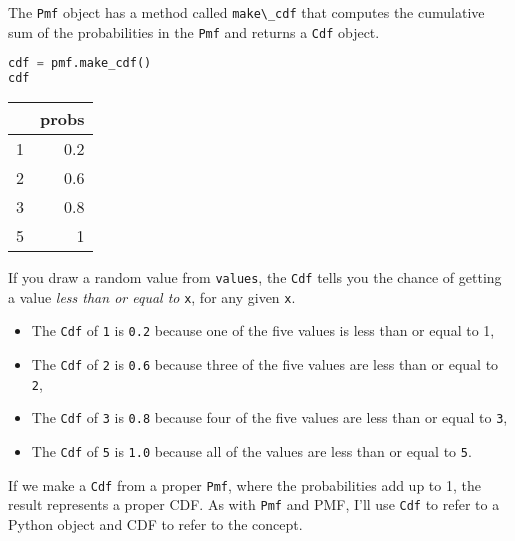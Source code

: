 The \passthrough{\lstinline!Pmf!} object has a method called
\passthrough{\lstinline!make\_cdf!} that computes the cumulative sum of
the probabilities in the \passthrough{\lstinline!Pmf!} and returns a
\passthrough{\lstinline!Cdf!} object.

\begin{lstlisting}[language=Python,style=source]
cdf = pmf.make_cdf()
cdf
\end{lstlisting}

\begin{tabular}{lr}
\midrule
 & probs \\
\midrule
1 & 0.2 \\
2 & 0.6 \\
3 & 0.8 \\
5 & 1 \\
\midrule
\end{tabular}

If you draw a random value from \passthrough{\lstinline!values!}, the
\passthrough{\lstinline!Cdf!} tells you the chance of getting a value
\emph{less than or equal to} \passthrough{\lstinline!x!}, for any given
\passthrough{\lstinline!x!}.

\begin{itemize}
\item
  The \passthrough{\lstinline!Cdf!} of \passthrough{\lstinline!1!} is
  \passthrough{\lstinline!0.2!} because one of the five values is less
  than or equal to 1,
\item
  The \passthrough{\lstinline!Cdf!} of \passthrough{\lstinline!2!} is
  \passthrough{\lstinline!0.6!} because three of the five values are
  less than or equal to \passthrough{\lstinline!2!},
\item
  The \passthrough{\lstinline!Cdf!} of \passthrough{\lstinline!3!} is
  \passthrough{\lstinline!0.8!} because four of the five values are less
  than or equal to \passthrough{\lstinline!3!},
\item
  The \passthrough{\lstinline!Cdf!} of \passthrough{\lstinline!5!} is
  \passthrough{\lstinline!1.0!} because all of the values are less than
  or equal to \passthrough{\lstinline!5!}.
\end{itemize}

If we make a \passthrough{\lstinline!Cdf!} from a proper
\passthrough{\lstinline!Pmf!}, where the probabilities add up to 1, the
result represents a proper CDF. As with \passthrough{\lstinline!Pmf!}
and PMF, I'll use \passthrough{\lstinline!Cdf!} to refer to a Python
object and CDF to refer to the concept.

